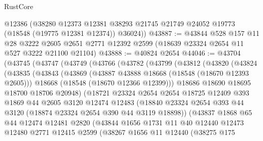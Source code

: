 \begin{lexlean}{RustCore}
\begin{coremodule}
      @12386
      (@38280
        @12373
        @12381
        @38293
        @21745
        @21749
        @24052
        @19773
        (@18548 (@19775 @12381 @12374))
        @36024))
@43887 := @43844
    @528
    @157
    @11
    @28
    @3222
    @2605
    @2651
    @2771
    @12392
    @2599
    (@18639 @23324 @2654 @11 @527 @3222 @21100 @21104)
@43888 := @40824 @2654
@44046 := @43704
    (@43745
      (@43747
        (@43749
          (@43766
            (@43782
              (@43799
                (@43812
                  (@43820
                    (@43824
                      (@43835
                        (@43843
                          (@43869
                            (@43887 @43888 @18668 (@18548 (@18670 @12393 @2605)))
                            @18668
                            (@18548 (@18670 @12366 @12399)))
                          @18686
                          @18690
                          @18695
                          @18700
                          @18706
                          @20948)
                        (@18721
                          @23324
                          @2654
                          @2654
                          @18725
                          @12409
                          @393
                          @1869
                          @44
                          @2605
                          @3120
                          @12474
                          @12483
                          (@18840
                            @23324
                            @2654
                            @393
                            @44
                            @3120
                            (@18874 @23324 @2654 @390 @44 @3119 @18898))
                          (@43837
                            @1868
                            @65
                            @44
                            @12474
                            @12481
                            @2820
                            (@43844
                              @1656
                              @1731
                              @11
                              @40
                              @12440
                              @12473
                              @12480
                              @2771
                              @12415
                              @2599
                              (@38267
                                @1656
                                @11
                                @12440
                                (@38275
                                  @175

\end{coremodule}
\end{lexlean}
